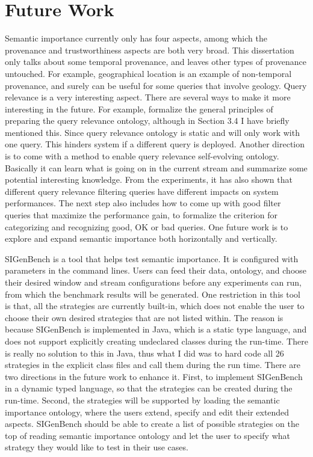 \section{Future Work}
Semantic importance currently only has four aspects, among which the provenance and trustworthiness aspects are both very broad. 
This dissertation only talks about some temporal provenance, and leaves other types of provenance untouched. 
For example, geographical location is an example of non-temporal provenance, and surely can be useful for some queries that involve geology.
Query relevance is a very interesting aspect. 
There are several ways to make it more interesting in the future.
For example, formalize the general principles of preparing the query relevance ontology, although in Section 3.4 I have briefly mentioned this. 
Since query relevance ontology is static and will only work with one query. 
This hinders system if a different query is deployed. 
Another direction is to come with a method to enable query relevance self-evolving ontology.
Basically it can learn what is going on in the current stream and summarize some potential interesting knowledge. 
From the experiments, it has also shown that different query relevance filtering queries have different impacts on system performances. 
The next step also includes how to come up with good filter queries that maximize the performance gain, to formalize the criterion for categorizing and recognizing good, OK or bad queries.
One future work is to explore and expand semantic importance both horizontally and vertically.

SIGenBench is a tool that helps test semantic importance.
It is configured with parameters in the command lines. 
Users can feed their data, ontology, and choose their desired window and stream configurations before any experiments can run, from which the benchmark results will be generated.
One restriction in this tool is that, all the strategies are currently built-in, which does not enable the user to choose their own desired strategies that are not listed within. 
The reason is because SIGenBench is implemented in Java, which is a static type language, and does not support explicitly creating undeclared classes during the run-time. 
There is really no solution to this in Java, thus what I did was to hard code all 26 strategies in the explicit class files and call them during the run time.
There are two directions in the future work to enhance it.
First, to implement SIGenBench in a dynamic typed language, so that the strategies can be created during the run-time.
Second, the strategies will be supported by loading the semantic importance ontology, where the users extend, specify and edit their extended aspects.
SIGenBench should be able to create a list of possible strategies on the top of reading semantic importance ontology and let the user to specify what strategy they would like to test in their use cases. 

